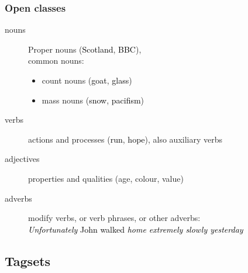 \documentclass{beamer}
\begin{document}
\begin{frame}
  \frametitle{Open classes}
  \begin{description}
  \item[nouns] Proper nouns (\textcolor{black}{Scotland}, \textcolor{black}{BBC}),\\
    common nouns:
    \begin{itemize}
    \item count nouns (\textcolor{black}{goat},
      \textcolor{black}{glass})
    \item mass nouns (\textcolor{black}{snow},
      \textcolor{black}{pacifism})
    \end{itemize}
  \item[verbs] actions and processes (\textcolor{black}{run},
    \textcolor{black}{hope}), also auxiliary verbs
  \item[adjectives] properties and qualities (age, colour, value)
  \item[adverbs] modify verbs, or verb phrases, or other adverbs:\\
    \textcolor{black}{\emph{Unfortunately} John walked \emph{home
        extremely slowly yesterday}}
  \end{description}
\end{frame}


\subsection{Tagsets}
\end{document}
